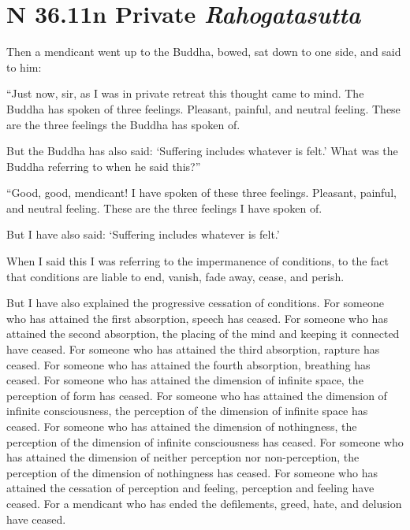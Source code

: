 \documentclass[12pt,openany]{book}%
\newcommand*{\suttatitleacronym}[1]{\smaller[2]{#1}\vspace*{.3em}}
\newcommand*{\suttatitletranslation}[1]{\linebreak{#1}}
\newcommand*{\suttatitleroot}[1]{\linebreak\smaller[2]\itshape{#1}}
\newcommand*{\tocacronym}[1]{\hspace*{-3.3em}{#1}\quad}
\newcommand*{\toctranslation}[1]{#1}
\newcommand*{\tocroot}[1]{(\textit{#1})}
\begin{document}
%
\section*{{\suttatitleacronym SN 36.11}{\suttatitletranslation In Private }{\suttatitleroot Rahogatasutta}}
\addcontentsline{toc}{section}{\tocacronym{SN 36.11} \toctranslation{In Private } \tocroot{Rahogatasutta}}

Then a mendicant went up to the Buddha, bowed, sat down to one side, and said to him: 

“Just now, sir, as I was in private retreat this thought came to mind. The Buddha has spoken of three feelings. Pleasant, painful, and neutral feeling. These are the three feelings the Buddha has spoken of. 

But the Buddha has also said: ‘Suffering includes whatever is felt.’ What was the Buddha referring to when he said this?” 

“Good, good, mendicant! I have spoken of these three feelings. Pleasant, painful, and neutral feeling. These are the three feelings I have spoken of. 

But I have also said: ‘Suffering includes whatever is felt.’ 

When I said this I was referring to the impermanence of conditions, to the fact that conditions are liable to end, vanish, fade away, cease, and perish. 

But I have also explained the progressive cessation of conditions. For someone who has attained the first absorption, speech has ceased. For someone who has attained the second absorption, the placing of the mind and keeping it connected have ceased. For someone who has attained the third absorption, rapture has ceased. For someone who has attained the fourth absorption, breathing has ceased. For someone who has attained the dimension of infinite space, the perception of form has ceased. For someone who has attained the dimension of infinite consciousness, the perception of the dimension of infinite space has ceased. For someone who has attained the dimension of nothingness, the perception of the dimension of infinite consciousness has ceased. For someone who has attained the dimension of neither perception nor non-perception, the perception of the dimension of nothingness has ceased. For someone who has attained the cessation of perception and feeling, perception and feeling have ceased. For a mendicant who has ended the defilements, greed, hate, and delusion have ceased. 
\end{document}
